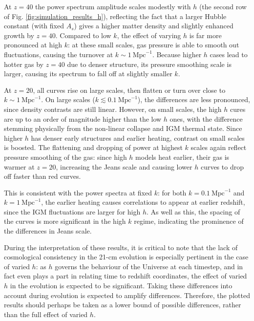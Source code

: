 \documentclass[floats,floatfix,showpacs,amssymb,prd,superscriptaddress,nofootinbib, 11pt]{revtex4-2} %
\begin{document}
At $z = 40$ the power spectrum amplitude scales modestly with $h$ (the second row of Fig. \ref{fig:simulation_results_h}), reflecting the fact that a larger Hubble constant (with fixed $A_s$) gives a higher matter density and slightly enhanced growth by $z = 40$. Compared to low $k$, the effect of varying $h$ is far more pronounced at high $k$: at these small scales, gas pressure is able to smooth out fluctuations, causing the turnover at $k \sim 1 ~\text{Mpc}^{-1}$. Because higher $h$ cases lead to hotter gas by $z = 40$ due to denser structure, its pressure smoothing scale is larger, causing its spectrum to fall off at slightly smaller $k$. 

At $z = 20$, all curves rise on large scales, then flatten or turn over close to $k \sim 1 ~\text{Mpc}^{-1}$. On large scales ($k \lesssim 0.1 ~\text{Mpc}^{-1}$), the differences are less pronounced, since density contrasts are still linear. However, on small scales, the high $h$ cures are up to an order of magnitude higher than the low $h$ ones, with the difference stemming physically from the non-linear collapse and IGM thermal state. Since higher $h$ has denser early structures and earlier heating, contrast on small scales is boosted. The flattening and dropping of power at highest $k$ scales again reflect pressure smoothing of the gas: since high $h$ models heat earlier, their gas is warmer at $z = 20$, increasing the Jeans scale and causing lower $h$ curves to drop off faster than red curves.

This is consistent with the power spectra at fixed $k$: for both $k = 0.1 ~\text{Mpc}^{-1}$ and $k = 1 ~\text{Mpc}^{-1}$, the earlier heating causes correlations to appear at earlier redshift, since the IGM fluctuations are larger for high $h$. As well as this, the spacing of the curves is more significant in the high $k$ regime, indicating the prominence of the differences in Jeans scale.

During the interpretation of these results, it is critical to note that the lack of cosmological consistency in the 21-cm evolution is especially pertinent in the case of varied $h$: as $h$ governs the behaviour of the Universe at each timestep, and in fact even plays a part in relating time to redshift coordinates, the effect of varied $h$ in the evolution is expected to be significant. Taking these differences into account during evolution is expected to amplify differences. Therefore, the plotted results should perhaps be taken as a lower bound of possible differences, rather than the full effect of varied $h$.
\end{document}
